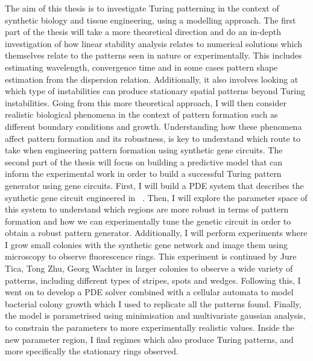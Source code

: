The aim of this thesis is to investigate Turing patterning in the context of synthetic biology and tissue engineering, using a modelling approach.
The first part of the thesis will take a more theoretical direction and do an in-depth investigation of how linear stability analysis relates to numerical solutions which themselves relate to the patterns seen in nature or experimentally.
This includes estimating wavelength, convergence time and in some cases pattern shape estimation from the dispersion relation.
Additionally, it also involves looking at which type of instabilities can produce stationary spatial patterns beyond Turing instabilities.
Going from this more theoretical approach, I will then consider realistic biological phenomena in the context of pattern formation such as different boundary conditions and growth.
Understanding how these phenomena affect pattern formation and its robustness, is key to understand which route to take when engineering pattern formation using synthetic gene circuits.
The second part of the thesis will focus on building a predictive model that can inform the experimental work in order to build a successful Turing pattern generator using gene circuits.
First, I will build a PDE system that describes the synthetic gene circuit engineered in ~\parencite{Tica2020}.
Then, I will explore the parameter space of this system to understand which regions are more robust in terms of pattern formation and how we can experimentally tune the genetic circuit in order to obtain a robust pattern generator.
Additionally, I will perform experiments where I grow small colonies with the synthetic gene network and image them using microscopy to observe fluorescence rings.
This experiment is continued by Jure Tica, Tong Zhu, Georg Wachter in larger colonies to observe a wide variety of patterns, including different types of stripes, spots and wedges.
Following this, I went on to develop a PDE solver combined with a cellular automata to model bacterial colony growth which I used to replicate all the patterns found.
Finally, the model is parametrised using minimisation and multivariate gaussian analysis, to constrain the parameters to more experimentally realistic values.
Inside the new parameter region, I find regimes which also produce Turing patterns, and more specifically the stationary rings observed.


